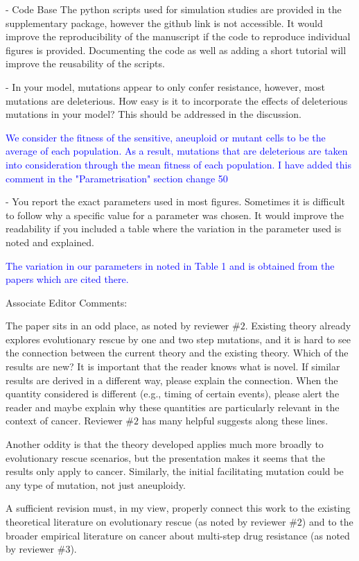 \documentclass[12pt]{extarticle}
\begin{document}
- Code Base
The python scripts used for simulation studies are provided in the supplementary package, however the github link is not accessible.
It would improve the reproducibility of the manuscript if the code to reproduce individual figures is provided.
Documenting the code as well as adding a short tutorial will improve the reusability of the scripts.

- In your model, mutations appear to only confer resistance, however, most mutations are deleterious. How easy is it to incorporate the effects of deleterious mutations in your model? This should be addressed in the discussion.

\textcolor{blue}{We consider the fitness of the sensitive, aneuploid or mutant cells to be the average of each population. As a result, mutations that are deleterious are taken into consideration through the mean fitness of each population. I have added this comment in the "Parametrisation" section change 50} 

- You report the exact parameters used in most figures. Sometimes it is difficult to follow why a specific value for a parameter was chosen. It would improve the readability if you included a table where the variation in the parameter used is noted and explained.

\textcolor{blue}{The variation in our parameters in noted in Table 1 and is obtained from the papers which are cited there.} 

Associate Editor Comments:

The paper sits in an odd place, as noted by reviewer $\#2$. Existing theory already explores evolutionary rescue by one and two step mutations, and it is hard to see the connection between the current theory and the existing theory. Which of the results are new? It is important that the reader knows what is novel. If similar results are derived in a different way, please explain the connection. When the quantity considered is different (e.g., timing of certain events), please alert the reader and maybe explain why these quantities are particularly relevant in the context of cancer. Reviewer $\#2$ has many helpful suggests along these lines.

Another oddity is that the theory developed applies much more broadly to evolutionary rescue scenarios, but the presentation makes it seems that the results only apply to cancer. Similarly, the initial facilitating mutation could be any type of mutation, not just aneuploidy.

A sufficient revision must, in my view, properly connect this work to the existing theoretical literature on evolutionary rescue (as noted by reviewer $\#2$) and to the broader empirical literature on cancer about multi-step drug resistance (as noted by reviewer $\#3$).
\end{document}
